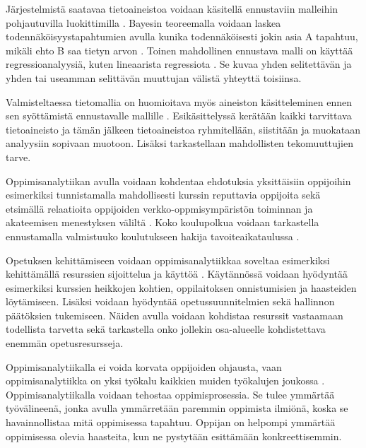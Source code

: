 Järjestelmistä saatavaa tietoaineistoa voidaan käsitellä ennustaviin malleihin pohjautuvilla luokittimilla \citep{hamalainenClassifiersEducationalData2010}. Bayesin teoreemalla voidaan laskea todennäköisyystapahtumien avulla kunika todennäköisesti jokin asia A tapahtuu, mikäli ehto B saa tietyn arvon \citep{natinggaDataScienceAlgorithms2018}. Toinen mahdollinen ennustava malli on käyttää regressioanalyysiä, kuten lineaarista regressiota \citep{rossIntroductoryStatistics2017}. Se kuvaa yhden selitettävän ja yhden tai useamman selittävän muuttujan välistä yhteyttä toisiinsa.

Valmisteltaessa tietomallia on huomioitava myös aineiston käsitteleminen ennen sen syöttämistä ennustavalle mallille \citep{romeroSurveyPreProcessingEducational2014, rossIntroductoryStatistics2017}. Esikäsittelyssä kerätään kaikki tarvittava tietoaineisto ja tämän jälkeen tietoaineistoa ryhmitellään, siistitään ja muokataan analyysiin sopivaan muotoon. Lisäksi tarkastellaan mahdollisten tekomuuttujien tarve.

Oppimisanalytiikan avulla voidaan kohdentaa ehdotuksia yksittäisiin oppijoihin esimerkiksi tunnistamalla mahdollisesti kurssin reputtavia oppijoita \citep{barberCourseCorrectionUsing2012} sekä etsimällä relaatioita oppijoiden verkko-oppmisympäristön toiminnan ja akateemisen menestyksen väliltä \citep{agudo-peregrinaCanWePredict2014}. Koko koulupolkua voidaan tarkastella ennustamalla valmistuuko koulutukseen hakija tavoiteaikataulussa \citep{barberCourseCorrectionUsing2012a}.

Opetuksen kehittämiseen voidaan oppimisanalytiikkaa soveltaa esimerkiksi kehittämällä resurssien sijoittelua ja käyttöä \citep{longPenetratingFogAnalytics2011, romeroEducationalDataMining2010}. Käytännössä voidaan hyödyntää esimerkiksi kurssien heikkojen kohtien, oppilaitoksen onnistumisien ja haasteiden löytämiseen. Lisäksi voidaan hyödyntää opetussuunnitelmien sekä hallinnon päätöksien tukemiseen. Näiden avulla voidaan kohdistaa resurssit vastaamaan todellista tarvetta sekä tarkastella onko jollekin osa-alueelle kohdistettava enemmän opetusresursseja.

Oppimisanalytiikalla ei voida korvata oppijoiden ohjausta, vaan oppimisanalytiikka on yksi työkalu kaikkien muiden työkalujen joukossa \citep{auvinenOppimisanalytiikkaTuleeOletko2017}. Oppimisanalytiikalla voidaan tehostaa oppimisprosessia. Se tulee ymmärtää työvälineenä, jonka avulla ymmärretään paremmin oppimista ilmiönä, koska se havainnollistaa mitä oppimisessa tapahtuu. Oppijan on helpompi ymmärtää oppimisessa olevia haasteita, kun ne pystytään esittämään konkreettisemmin.
